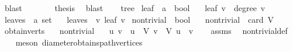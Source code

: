 \begin{isabellebody}
\ blast\isanewline
\ \ \ \ \isamarkupfalse%
\ \isamarkupfalse%
\ {\isacharquery}{\kern0pt}thesis\ \isamarkupfalse%
\ blast\isanewline
\ \ \isamarkupfalse%
\isanewline
{}\isamarkupfalse%
%
\endisatagproof
{\isafoldproof}%
%
\isadelimproof
\isanewline
%
\endisadelimproof
\isanewline
{}\isamarkupfalse%
\ tree\isanewline
{}\isanewline
\isanewline
{}\isamarkupfalse%
\ leaf\ {\isacharcolon}{\kern0pt}{\isacharcolon}{\kern0pt}\ {\isachardoublequoteopen}{\isacharprime}{\kern0pt}a\ {\isasymRightarrow}\ bool{\isachardoublequoteclose}\ \isanewline
\ \ {\isachardoublequoteopen}leaf\ v\ {\isasymlongleftrightarrow}\ degree\ v\ {\isacharequal}{\kern0pt}\ {}{\isachardoublequoteclose}\isanewline
\isanewline
{}\isamarkupfalse%
\ leaves\ {\isacharcolon}{\kern0pt}{\isacharcolon}{\kern0pt}\ {\isachardoublequoteopen}{\isacharprime}{\kern0pt}a\ set{\isachardoublequoteclose}\ \isanewline
\ \ {\isachardoublequoteopen}leaves\ {\isacharequal}{\kern0pt}\ {\isacharbraceleft}{\kern0pt}v{\isachardot}{\kern0pt}\ leaf\ v{\isacharbraceright}{\kern0pt}{\isachardoublequoteclose}\isanewline
\isanewline
{}\isamarkupfalse%
\ non{\isacharunderscore}{\kern0pt}trivial\ {\isacharcolon}{\kern0pt}{\isacharcolon}{\kern0pt}\ {\isachardoublequoteopen}bool{\isachardoublequoteclose}\ \isanewline
\ \ {\isachardoublequoteopen}non{\isacharunderscore}{\kern0pt}trivial\ {\isasymlongleftrightarrow}\ card\ V\ {\isasymge}\ {}{\isachardoublequoteclose}\isanewline
\isanewline
{}\isamarkupfalse%
\ obtain{\isacharunderscore}{\kern0pt}{}{\isacharunderscore}{\kern0pt}verts{\isacharcolon}{\kern0pt}\isanewline
\ \ \ {\isachardoublequoteopen}non{\isacharunderscore}{\kern0pt}trivial{\isachardoublequoteclose}\isanewline
\ \ \ u\ v\ \ {\isachardoublequoteopen}u\ {\isasymin}\ V{\isachardoublequoteclose}\ {\isachardoublequoteopen}v\ {\isasymin}\ V{\isachardoublequoteclose}\ {\isachardoublequoteopen}u\ {\isasymnoteq}\ v{\isachardoublequoteclose}\isanewline
%
\isadelimproof
\ \ %
\endisadelimproof
%
\isatagproof
{}\isamarkupfalse%
\ assms\ \isamarkupfalse%
\ non{\isacharunderscore}{\kern0pt}trivial{\isacharunderscore}{\kern0pt}def\isanewline
\ \ \isamarkupfalse%
\ {\isacharparenleft}{\kern0pt}meson\ diameter{\isacharunderscore}{\kern0pt}obtains{\isacharunderscore}{\kern0pt}path{\isacharunderscore}{\kern0pt}vertices{\isacharparenright}{\kern0pt}%

\end{isabellebody}

